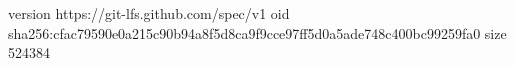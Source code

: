 version https://git-lfs.github.com/spec/v1
oid sha256:cfac79590e0a215c90b94a8f5d8ca9f9cce97ff5d0a5ade748c400bc99259fa0
size 524384
